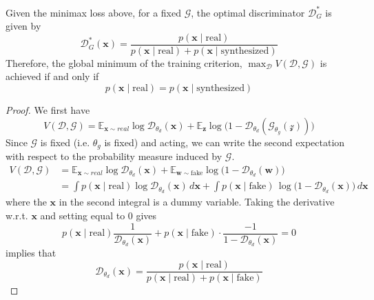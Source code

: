\documentclass{article}
\begin{document}
  \begin{theorem} 
    Given the minimax loss above, for a fixed $\mathcal{G}$, the optimal discriminator $\mathcal{D}_G^\ast$ is given by 
    \begin{equation}
      \mathcal{D}_G^\ast (\mathbf{x}) = \frac{p(\mathbf{x} \mid \text{real})}{p(\mathbf{x} \mid \text{real}) + p(\mathbf{x} \mid \text{synthesized})}
    \end{equation}
    Therefore, the global minimum of the training criterion, $\max_{\mathcal{D}} V(\mathcal{D}, \mathcal{G})$ is achieved if and only if 
    \begin{equation}
      p(\mathbf{x} \mid \text{real}) = p(\mathbf{x} \mid \text{synthesized})
    \end{equation}
  \end{theorem}
  \begin{proof} 
    We first have 
    \begin{equation}
      V(\mathcal{D}, \mathcal{G}) = \mathbb{E}_{\mathbf{x} \sim real} \log \mathcal{D}_{\theta_d} (\mathbf{x}) + \mathbb{E}_{\mathbf{z}} \log \big( 1 - \mathcal{D}_{\theta_d} (\mathcal{G}_{\theta_g} (\mathcal{z}))\big) 
    \end{equation}
    Since $\mathcal{G}$ is fixed (i.e. $\theta_g$ is fixed) and acting, we can write the second expectation with respect to the probability measure induced by $\mathcal{G}$.
    \begin{align*} 
      V(\mathcal{D}, \mathcal{G}) & = \mathbb{E}_{\mathbf{x} \sim real} \log \mathcal{D}_{\theta_d} (\mathbf{x}) + \mathbb{E}_{\mathbf{w} \sim \text{fake}} \log \big( 1 - \mathcal{D}_{\theta_d} (\mathbf{w}) \big) \\   
                                      & = \int p(\mathbf{x} \mid \text{real}) \log \mathcal{D}_{\theta_d}(\mathbf{x}) \,d\mathbf{x}+ \int p(\mathbf{x} \mid \text{fake}) \, \log \big( 1 - \mathcal{D}_{\theta_d} (\mathbf{x}) \big) \,d\mathbf{x} 
    \end{align*}
    where the $\mathbf{x}$ in the second integral is a dummy variable. Taking the derivative w.r.t. $\mathbf{x}$ and setting equal to $0$ gives 
    \begin{equation}
      p(\mathbf{x} \mid \text{real}) \frac{1}{\mathcal{D}_{\theta_d} (\mathbf{x})} + p(\mathbf{x} \mid \text{fake}) \cdot \frac{-1}{1 - \mathcal{D}_{\theta_d}(\mathbf{x})} = 0
    \end{equation}
    implies that 
    \begin{equation}
      \mathcal{D}_{\theta_d}( \mathbf{x}) = \frac{p(\mathbf{x} \mid \text{real})}{p(\mathbf{x} \mid \text{real}) + p(\mathbf{x} \mid \text{fake})}
    \end{equation}
  \end{proof} 
\end{document}
